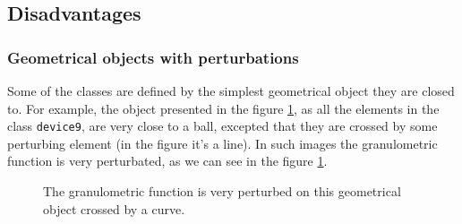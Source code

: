 \subsection{Disadvantages}

\subsubsection{Geometrical objects with perturbations}

\label{geo-perturb}

Some of the classes are defined by the simplest geometrical object they are closed to. For example, the object presented in the figure \ref{device9-6}, as all the elements in the class \texttt{device9}, are very close to a ball, excepted that they are crossed by some perturbing element (in the figure it's a line). In such images the granulometric function is very perturbated, as we can see in the figure \ref{device9-6}.

\begin{figure}[!ht]
    \centering
    \qquad\qquad\qquad
    \caption{The granulometric function is very perturbed on this geometrical object crossed by a curve.}
	\label{device9-6}
\end{figure}

